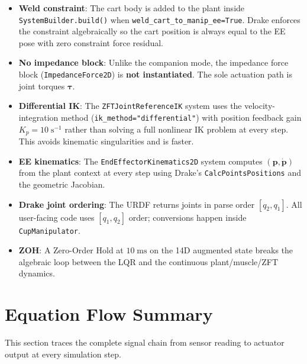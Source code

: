 \documentclass[11pt, a4paper]{article}
\begin{document}
\begin{itemize}
  \item \textbf{Weld constraint}: The cart body is added to the plant inside
        \texttt{SystemBuilder.build()} when \texttt{weld\_cart\_to\_manip\_ee=True}.
        Drake enforces the constraint algebraically so the cart position is
        always equal to the EE pose with zero constraint force residual.

  \item \textbf{No impedance block}: Unlike the companion mode, the impedance
        force block (\texttt{ImpedanceForce2D}) is \textbf{not instantiated}.
        The sole actuation path is joint torques $\bm{\tau}$.

  \item \textbf{Differential IK}: The \texttt{ZFTJointReferenceIK} system uses
        the velocity-integration method (\texttt{ik\_method="differential"})
        with position feedback gain $K_p = 10\;\mathrm{s}^{-1}$ rather than
        solving a full nonlinear IK problem at every step.  This avoids
        kinematic singularities and is faster.

  \item \textbf{EE kinematics}: The \texttt{EndEffectorKinematics2D} system
        computes $(\bm{p}, \dot{\bm{p}})$ from the plant context at every
        step using Drake's \texttt{CalcPointsPositions} and the geometric
        Jacobian.

  \item \textbf{Drake joint ordering}: The URDF returns joints in parse order
        $[q_2, q_1]$.  All user-facing code uses $[q_1, q_2]$ order;
        conversions happen inside \texttt{CupManipulator}.

  \item \textbf{ZOH}: A Zero-Order Hold at $10\;\mathrm{ms}$ on the 14D
        augmented state breaks the algebraic loop between the LQR and the
        continuous plant/muscle/ZFT dynamics.
\end{itemize}

\newpage
\section{Equation Flow Summary}

This section traces the complete signal chain from sensor reading to actuator
output at every simulation step.
\end{document}
